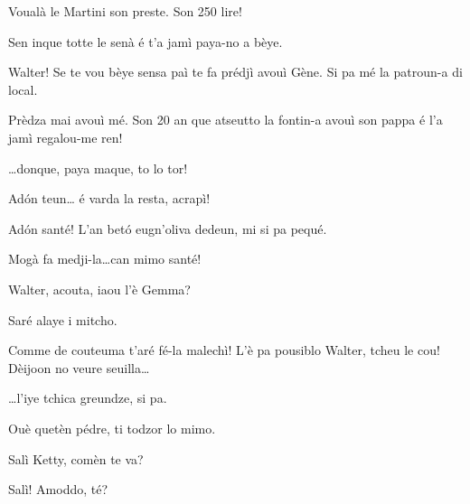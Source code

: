 \begin{drama}
\Dorinaspeaks Voualà le Martini son preste. Son 250 lire! 

\Walterspeaks	Sen inque totte le senà é t'a  jamì paya-no a bèye.

\Dorinaspeaks{} Walter! Se te vou bèye sensa paì te fa prédjì avouì Gène. Si pa mé la patroun-a di local.


\Genespeaks Prèdza mai avouì mé.  Son 20 an que atseutto la fontin-a avouì son pappa é l'a jamì regalou-me ren!


\Genespeaks{} \ldots donque, paya maque, to lo tor!

\Walterspeaks	Ad\'on teun\ldots {} é varda la resta, acrapì!

\Selmospeaks{} Ad\'on santé! L'an bet\'o eugn'oliva dedeun, mi si pa pequé.

\Walterspeaks Mogà fa medji-la\ldots can mimo santé!




\Kettyspeaks{} Walter, acouta, iaou l'è Gemma?

 
\Walterspeaks	Saré alaye i mitcho.

\Kettyspeaks Comme de couteuma t’aré fé-la  malechì! L'è pa pousiblo Walter, tcheu le cou! Dèijoon no veure seuilla\ldots


\Walterspeaks \ldots l'iye tchica greundze, si pa.

\Kettyspeaks Ouè quetèn pédre, ti todzor lo mimo.


\Selmospeaks 	{} Salì Ketty, comèn te va? 

\Kettyspeaks{} Salì! Amoddo, té?


\end{drama}
